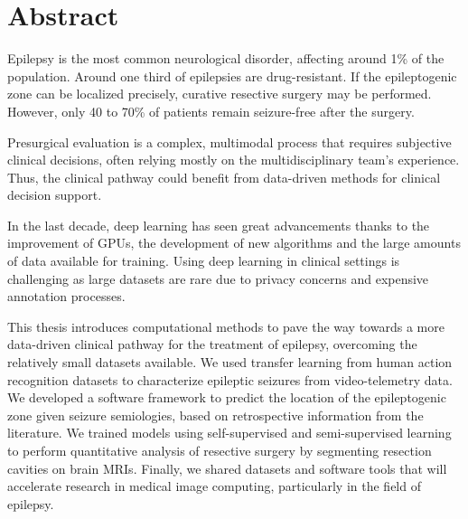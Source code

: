 \chapter{Abstract}


Epilepsy is the most common neurological disorder, affecting around 1\% of the population.
Around one third of epilepsies are drug-resistant.
If the epileptogenic zone can be localized precisely, curative resective surgery may be performed.
However, only 40 to 70\% of patients remain seizure-free after the surgery.

Presurgical evaluation is a complex, multimodal process that requires subjective clinical decisions, often relying mostly on the multidisciplinary team's experience.
Thus, the clinical pathway could benefit from data-driven methods for clinical decision support.

In the last decade, deep learning has seen great advancements thanks to the improvement of \acp{GPU}, the development of new algorithms and the large amounts of data available for training.
Using deep learning in clinical settings is challenging as large datasets are rare due to privacy concerns and expensive annotation processes.

This thesis introduces computational methods to pave the way towards a more data-driven clinical pathway for the treatment of epilepsy, overcoming the relatively small datasets available.
We used transfer learning from human action recognition datasets to characterize epileptic seizures from video-telemetry data.
We developed a software framework to predict the location of the epileptogenic zone given seizure semiologies, based on retrospective information from the literature.
We trained models using self-supervised and semi-supervised learning to perform quantitative analysis of resective surgery by segmenting resection cavities on brain \acp{MRI}.
Finally, we shared datasets and software tools that will accelerate research in medical image computing, particularly in the field of epilepsy.
